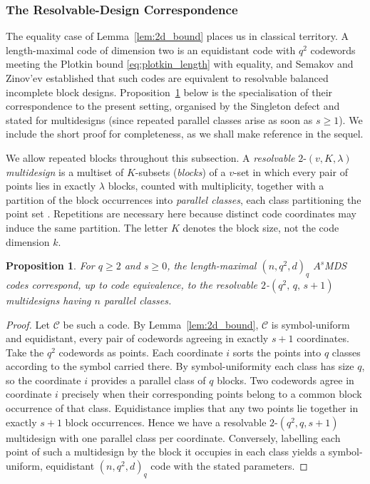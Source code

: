 \documentclass[12pt, letterpaper]{article}
\theoremstyle{plain}
\newtheorem{proposition}[theorem]{Proposition}
\theoremstyle{definition}
\newcommand{\mc}[1]{\mathcal{#1}}
\begin{document}
	\subsubsection{The Resolvable-Design Correspondence}
	\label{sec:resolvable_correspondence}

	The equality case of Lemma~\ref{lem:2d_bound} places us in classical territory. A length-maximal code of dimension two is an equidistant code with $q^2$ codewords meeting the Plotkin bound \eqref{eq:plotkin_length} with equality, and Semakov and Zinov'ev \cite{SemakovZinoviev1968} established that such codes are equivalent to resolvable balanced incomplete block designs. Proposition~\ref{prop:2d_design_equiv} below is the specialisation of their correspondence to the present setting, organised by the Singleton defect and stated for multidesigns (since repeated parallel classes arise as soon as $s \ge 1$). We include the short proof for completeness, as we shall make reference in the sequel.

	We allow repeated blocks throughout this subsection. A \emph{resolvable} $2$-$(v,K,\lambda)$ \emph{multidesign} is a multiset of $K$-subsets 	(\emph{blocks}) of a $v$-set in which every pair of points lies in exactly $\lambda$ blocks, counted with multiplicity, together with a partition of the block occurrences into \emph{parallel classes}, each class partitioning the point set \cite{BethJungnickelLenz1999}. Repetitions are necessary here because distinct code coordinates may induce the same partition. The letter $K$ denotes the block size, not the code dimension $k$.

	\begin{proposition}\label{prop:2d_design_equiv}
		For $q \ge 2$ and $s \ge 0$, the length-maximal $(n, q^2, d)_q$ $A^s$MDS codes correspond, up to code equivalence, to the resolvable $2$-$(q^2,\, q,\, s+1)$ multidesigns having $n$ parallel classes.
	\end{proposition}

	\begin{proof}
		Let $\mc{C}$ be such a code. By Lemma~\ref{lem:2d_bound}, $\mc{C}$ is symbol-uniform and equidistant, every pair of codewords agreeing in exactly $s+1$ coordinates. 
		Take the $q^2$ codewords as points. Each coordinate $i$ sorts the points into $q$ classes according to the symbol carried there. By symbol-uniformity each class has size $q$, so the coordinate $i$ provides a parallel class of $q$ blocks. 
		Two codewords agree in coordinate $i$ precisely when their corresponding points belong to a common block occurrence of that class. Equidistance implies that any two points lie together in exactly $s+1$ block occurrences. Hence we have a resolvable $2$-$(q^2,q,s+1)$ multidesign with one parallel class per coordinate. Conversely, labelling each point of such a multidesign by the block it occupies in each class yields a symbol-uniform, equidistant $(n,q^2,d)_q$ code with the stated parameters.
	\end{proof}
\end{document}
